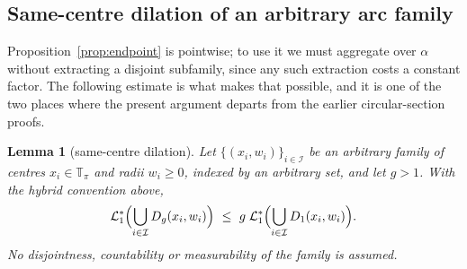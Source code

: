 \documentclass[11pt]{article}
\theoremstyle{plain}
\newtheorem{lemma}[theorem]{Lemma}
\theoremstyle{definition}
\theoremstyle{remark}
\newcommand{\Tp}{\mathbb{T}_{\pi}}
\newcommand{\Lone}{\mathcal{L}^{*}_{1}}
\begin{document}
\subsection{Same-centre dilation of an arbitrary arc family}

Proposition~\ref{prop:endpoint} is pointwise; to use it we must aggregate over
$\alpha$ without extracting a disjoint subfamily, since any such extraction costs
a constant factor. The following estimate is what makes that possible, and it is
one of the two places where the present argument departs from the earlier
circular-section proofs.

\begin{lemma}[same-centre dilation]\label{lem:dilation}
Let $\{(x_{i},w_{i})\}_{i\in\mathcal I}$ be an arbitrary family of centres
$x_{i}\in\Tp$ and radii $w_{i}\ge0$, indexed by an arbitrary set, and let $g>1$.
With the hybrid convention above,
\[
  \Lone\Bigl(\bigcup_{i\in\mathcal I}D_{g}(x_{i},w_{i})\Bigr)
  \ \le\ g\;\Lone\Bigl(\bigcup_{i\in\mathcal I}D_{1}(x_{i},w_{i})\Bigr).
\]
No disjointness, countability or measurability of the family is assumed.
\end{lemma}
\end{document}
